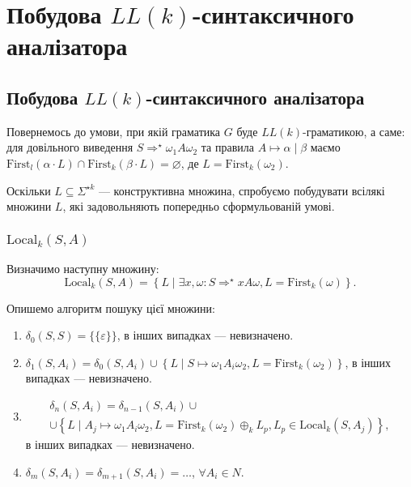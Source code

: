 \setcounter{section}{11}

\section{Побудова $LL(k)$-синтаксичного аналізатора}

\subsection{Побудова $LL(k)$-синтаксичного аналізатора}

Повернемось до умови, при якій граматика $G$ буде $LL(k)$-граматикою, а саме: для довільного виведення $S \Rightarrow^\star \omega_1 A \omega_2$ та правила $A \mapsto \alpha \mid \beta$ маємо $\text{First}_l(\alpha \cdot L) \cap \text{First}_k(\beta \cdot L) = \varnothing$, де $L = \text{First}_k(\omega_2)$. \medskip

Оскільки $L \subseteq \Sigma^{\star k}$ --- конструктивна множина, спробуємо побудувати всілякі множини $L$, які задовольняють попередньо сформульованій умові.

\subsubsection{$\text{Local}_k(S, A)$}

Визначимо наступну множину:
\begin{equation}
	\text{Local}_k(S, A) = \left\{ L \mid \exists x, \omega: S \Rightarrow^\star xA\omega, L = \text{First}_k(\omega) \right\}.
\end{equation}

Опишемо алгоритм пошуку цієї множини:
\begin{enumerate}
\item $\delta_0(S, S) = \{\{\varepsilon\}\}$, в інших випадках --- невизначено.
\item $\delta_1(S, A_i) = \delta_0(S, A_i) \cup \left\{ L \mid S \mapsto \omega_1 A_i \omega_2, L = \text{First}_k (\omega_2) \right\}$, в інших випадках --- невизначено.
\item 
\begin{multline*}
	\delta_n(S, A_i) = \delta_{n - 1}(S, A_i) \cup \\
	\cup \left\{ L \mid A_j \mapsto \omega_1 A_i \omega_2, L = \text{First}_k (\omega_2) \oplus_k L_p, L_p \in \text{Local}_k(S, A_j) \right\},
\end{multline*}
в інших випадках --- невизначено.
\item $\delta_m(S, A_i) = \delta_{m + 1}(S, A_i) = \ldots$, $\forall A_i \in N$.
\end{enumerate}


